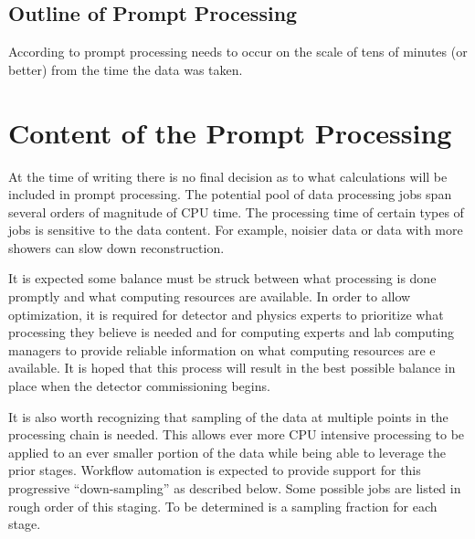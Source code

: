 \documentclass[pdftex,12pt,letter]{article}
\begin{document}
\subsection{Outline of Prompt Processing}
\label{sec:outline}
According to \cite{docdb1811}  prompt processing needs to occur on the scale
of tens of minutes (or better) from the time the data was taken.



\section{Content of the Prompt Processing}
At the time of writing there is no final decision as to what calculations will be included in prompt processing.
The potential pool of data processing jobs span several orders of magnitude of CPU time.
The processing time of certain types of jobs is sensitive to the data content.  
For example, noisier data or data with more showers can slow down reconstruction.

It is expected some balance must be struck between what processing is
done promptly and what computing resources are available.  In order to
allow optimization, it is required for detector and physics experts to
prioritize what processing they believe is needed and for computing
experts and lab computing managers to provide reliable information on
what computing resources are e available. It is hoped that this process
will result in the best possible balance in place when
the detector commissioning begins.

It is also worth recognizing that sampling of the data at
multiple points in the processing chain is needed.  This allows ever
more CPU intensive processing to be applied to an ever smaller portion
of the data while being able to leverage the prior stages.  Workflow
automation is expected to provide support for this progressive 
``down-sampling'' as described below.
Some possible jobs are listed in rough order of this staging.  To be
determined is a sampling fraction for each stage.
\end{document}
